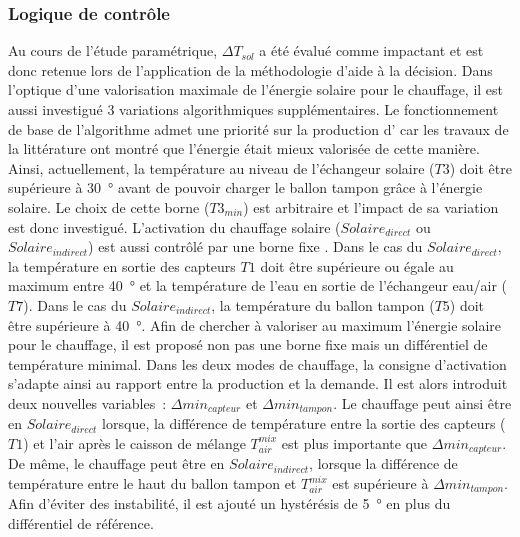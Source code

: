 \subsubsection{Logique de contrôle} %
\label{ssub:logique_de_controle}
Au cours de l’étude paramétrique, $\Delta T_{sol}$ a été évalué comme impactant et est
donc retenue lors de l’application de la méthodologie d’aide à la décision. Dans l’optique
d’une valorisation maximale de l’énergie solaire pour le chauffage, il est aussi
investigué $3$ variations algorithmiques supplémentaires. Le fonctionnement de base de
l’algorithme admet une priorité sur la production d’ car les travaux de la
littérature ont montré que l’énergie était mieux valorisée de cette manière. Ainsi,
actuellement, la température au niveau de l’échangeur solaire ($T3$) doit être supérieure
à \SI{30}{\degree} avant de pouvoir charger le ballon tampon grâce à l’énergie solaire. Le
choix de cette borne ($T3_{min}$) est arbitraire et l’impact de sa variation est donc
investigué. L’activation du chauffage solaire ($Solaire_{direct}$ ou $Solaire_{indirect}$)
est aussi contrôlé par une borne fixe . Dans le cas du
$Solaire_{direct}$, la température en sortie des capteurs $T1$ doit être supérieure ou
égale au maximum entre \SI{40}{\degree} et la température de l’eau en sortie de
l’échangeur eau/air ($T7$). Dans le cas du $Solaire_{indirect}$, la température du ballon
tampon ($T5$) doit être supérieure à \SI{40}{\degree}. Afin de chercher à valoriser au
maximum l’énergie solaire pour le chauffage, il est proposé non pas une borne fixe mais un
différentiel de température minimal. Dans les deux modes de chauffage, la consigne
d’activation s’adapte ainsi au rapport entre la production et la demande. Il est alors
introduit deux nouvelles variables~: $\Delta min_{capteur}$ et $\Delta min_{tampon}$. Le
chauffage peut ainsi être en $Solaire_{direct}$ lorsque, la différence de température
entre la sortie des capteurs ($T1$) et l’air après le caisson de mélange $T_{air}^{mix}$
est plus importante que $\Delta min_{capteur}$. De même, le chauffage peut être en
$Solaire_{indirect}$, lorsque la différence de température entre le haut du ballon tampon
et $T_{air}^{mix}$ est supérieure à $\Delta min_{tampon}$. Afin d’éviter des instabilité,
il est ajouté un hystérésis de \SI{5}{\degree} en plus du différentiel de référence.



